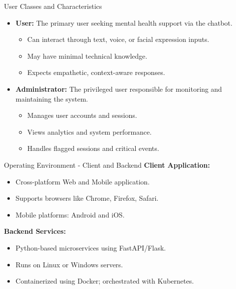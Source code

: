 \documentclass{beamer}
\begin{document}
\begin{frame}{User Classes and Characteristics}
\begin{itemize}
    \item \textbf{User:}  
    The primary user seeking mental health support via the chatbot.  
    \begin{itemize}
        \item Can interact through text, voice, or facial expression inputs.
        \item May have minimal technical knowledge.
        \item Expects empathetic, context-aware responses.
    \end{itemize}

    \item \textbf{Administrator:}  
    The privileged user responsible for monitoring and maintaining the system.  
    \begin{itemize}
        \item Manages user accounts and sessions.
        \item Views analytics and system performance.
        \item Handles flagged sessions and critical events.
    \end{itemize}
\end{itemize}
\end{frame}


\begin{frame}{Operating Environment - Client and Backend}
\textbf{Client Application:}
\begin{itemize}
    \item Cross-platform Web and Mobile application.
    \item Supports browsers like Chrome, Firefox, Safari.
    \item Mobile platforms: Android and iOS.
\end{itemize}

\textbf{Backend Services:}
\begin{itemize}
    \item Python-based microservices using FastAPI/Flask.
    \item Runs on Linux or Windows servers.
    \item Containerized using Docker; orchestrated with Kubernetes.
\end{itemize}
\end{frame}
\end{document}
